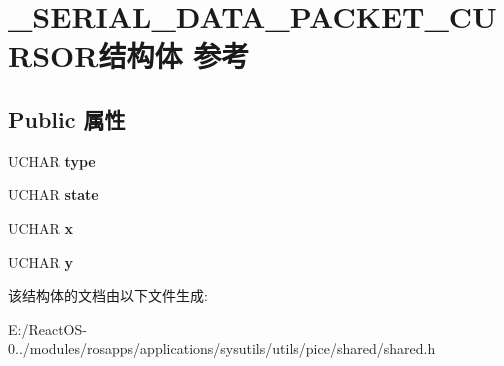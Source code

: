 \hypertarget{struct___s_e_r_i_a_l___d_a_t_a___p_a_c_k_e_t___c_u_r_s_o_r}{}\section{\+\_\+\+S\+E\+R\+I\+A\+L\+\_\+\+D\+A\+T\+A\+\_\+\+P\+A\+C\+K\+E\+T\+\_\+\+C\+U\+R\+S\+O\+R结构体 参考}
\label{struct___s_e_r_i_a_l___d_a_t_a___p_a_c_k_e_t___c_u_r_s_o_r}
\subsection*{Public 属性}
\begin{DoxyCompactItemize}
\item 
\mbox{\label{struct___s_e_r_i_a_l___d_a_t_a___p_a_c_k_e_t___c_u_r_s_o_r_abe365446c69b027b1214c8a2123a7801}} 
U\+C\+H\+AR {\bfseries type}
\item 
\mbox{\label{struct___s_e_r_i_a_l___d_a_t_a___p_a_c_k_e_t___c_u_r_s_o_r_adbee7e9c23e4b993510b033ccfc0eed5}} 
U\+C\+H\+AR {\bfseries state}
\item 
\mbox{\label{struct___s_e_r_i_a_l___d_a_t_a___p_a_c_k_e_t___c_u_r_s_o_r_a3e1601ea12c90dba05438a1b1b83fd56}} 
U\+C\+H\+AR {\bfseries x}
\item 
\mbox{\label{struct___s_e_r_i_a_l___d_a_t_a___p_a_c_k_e_t___c_u_r_s_o_r_ac6a8c4cdfb9fb1c3b4e9df977710e789}} 
U\+C\+H\+AR {\bfseries y}
\end{DoxyCompactItemize}


该结构体的文档由以下文件生成\+:\begin{DoxyCompactItemize}
\item 
E\+:/\+React\+O\+S-\/0../modules/rosapps/applications/sysutils/utils/pice/shared/shared.\+h\end{DoxyCompactItemize}
